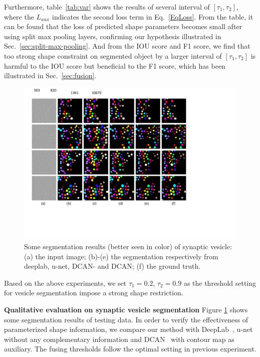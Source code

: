 Furthermore, table~\ref{tab:var} shows the results of several interval of $[\tau_1,\tau_2]$, where the $L_{aux}$ indicates the second loss term in Eq.~\ref{EqLoss}.
From the table, it can be found that the loss of predicted shape parameters becomes small after using split max pooling layers, confirming our hypothesis illustrated in Sec.~\ref{sec:split-max-pooling}.
And from the IOU score and F1 score, we find that too strong shape constraint on segmented object by a larger interval of $[\tau_1,\tau_2]$ is harmful to the IOU score but beneficial to the F1 score, which has been illustrated in Sec.~\ref{sec:fusion}.
\begin{figure}
    \begin{center}
        \includegraphics[width=6.8in]{figures/FigVesicle.pdf}
    \end{center}
    \caption{Some segmentation results (better seen in color) of synaptic vesicle: (a) the input image; (b)-(e) the segmentation respectively from deeplab, u-net, DCAN- and DCAN; (f) the ground truth.}
    \label{FigVesicle}
\end{figure}

Based on the above experiments, we set $\tau_1=0.2$, $\tau_2=0.9$ as the threshold setting for vesicle segmentation impose a strong shape restriction.

\noindent\textbf{Qualitative evaluation on synaptic vesicle segmentation}
Figure \ref{FigVesicle} shows some segmentation results of testing data.
In order to verify the effectiveness of parameterized shape information, we compare our method with DeepLab~\cite{Chen2014a}, u-net~\cite{Ronneberger2015} without any complementary information and DCAN~\cite{Chen2016a} with contour map as auxiliary.
The fusing thresholds follow the optimal setting in previous experiment.

